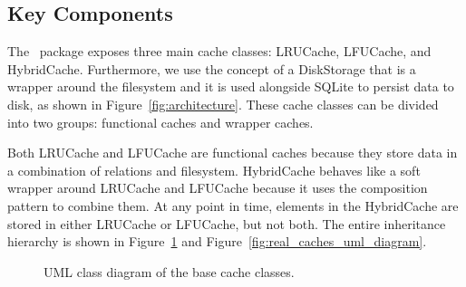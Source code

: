 \subsection{Key Components}
The \sqlitecache~package exposes three main cache classes: LRUCache, LFUCache, and HybridCache.
Furthermore, we use the concept of a DiskStorage that is a wrapper around the filesystem
and it is used alongside SQLite to persist data to disk, as shown in Figure~\ref{fig:architecture}.
These cache classes can be divided into two groups: functional caches and wrapper caches.

Both LRUCache and LFUCache are functional caches because they store data
in a combination of relations and filesystem.
HybridCache behaves like a soft wrapper around LRUCache and LFUCache because
it uses the composition pattern to combine them. At any point in time,
elements in the HybridCache are stored in either LRUCache or LFUCache, but not both.
The entire inheritance hierarchy is shown in Figure~\ref{fig:base_cache_uml_diagram}
and Figure~\ref{fig:real_caches_uml_diagram}.

\begin{figure}
    \centering
    \caption{UML class diagram of the base cache classes.}
    \label{fig:base_cache_uml_diagram}
\end{figure}

